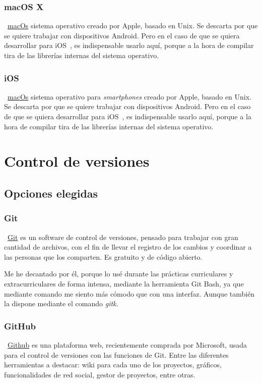 \subsubsection{macOS X}
~\href{https://www.apple.com/es/macos}{macOs} sistema operativo creado por Apple, basado en Unix. Se descarta por que se quiere trabajar con dispositivos Android. Pero en el caso de que se quiera desarrollar para iOS~\pageref{ios}, es indispensable usarlo aquí, porque a la hora de compilar tira de las librerías internas del sistema operativo.

\subsubsection{iOS}
~\href{https://www.apple.com/es/macos}{macOs} sistema operativo para \emph{smartphones} creado por Apple, basado en Unix. Se descarta por que se quiere trabajar con dispositivos Android. Pero en el caso de que se quiera desarrollar para iOS~\pageref{ios}, es indispensable usarlo aquí, porque a la hora de compilar tira de las librerías internas del sistema operativo.
\section{Control de versiones}

\subsection{Opciones elegidas}

\subsubsection{Git}
~\href{https://git-scm.com//}{Git} es un software de control de versiones, pensado para trabajar con gran cantidad de archivos, con el fin de llevar el registro de los cambios y coordinar a las personas que los comparten. Es gratuito y de código abierto.

Me he decantado por él, porque lo usé durante las prácticas curriculares y extracurriculares de forma intensa, mediante la herramienta Git Bash, ya que mediante comando me siento más cómodo que con una interfaz. Aunque también la dispone mediante el comando \emph{gitk}.

\subsubsection{GitHub}\label{github}
~\href{https://github.com/}{Github} es una plataforma web, recientemente comprada por Microsoft, usada para el control de versiones con las funciones de Git. Entre las diferentes herramientas a destacar: wiki para cada uno de los proyectos, gráficos, funcionalidades de red social, gestor de proyectos, entre otras.

